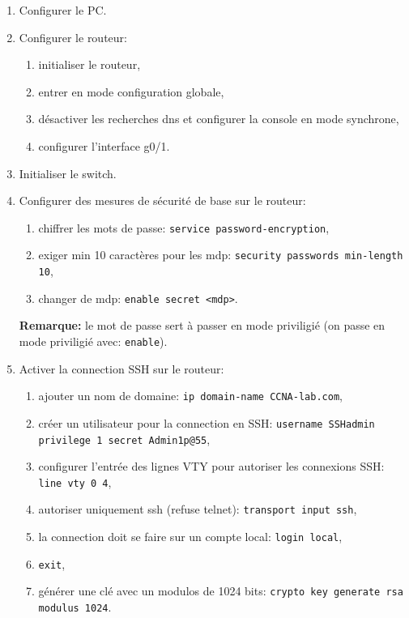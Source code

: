 \documentclass[a4paper]{article}
\begin{document}
\begin{enumerate}

    \item Configurer le PC.

    \item Configurer le routeur:
    \begin{enumerate}
        \item initialiser le routeur,
        \item entrer en mode configuration globale,
        \item désactiver les recherches dns et configurer la console en mode synchrone,
        \item configurer l'interface g0/1.
    \end{enumerate}

    \item Initialiser le switch.

    \item Configurer des mesures de sécurité de base sur le routeur:
    \begin{enumerate}
        \item chiffrer les mots de passe: \texttt{service password-encryption},
        \item exiger min 10 caractères pour les mdp: \texttt{security passwords min-length 10},
        \item changer de mdp: \texttt{enable secret <mdp>}.
    \end{enumerate}
    \textbf{Remarque:} le mot de passe sert à passer en mode priviligié (on passe en mode priviligié avec: \texttt{enable}).

    \item Activer la connection SSH sur le routeur:
    \begin{enumerate}
        \item ajouter un nom de domaine: \texttt{ip domain-name CCNA-lab.com},
        \item créer un utilisateur pour la connection en SSH: \texttt{username SSHadmin privilege 1 secret Admin1p@55},
        \item configurer l'entrée des lignes VTY pour autoriser les connexions SSH: \texttt{line vty 0 4},
        \item autoriser uniquement ssh (refuse telnet): \texttt{transport input ssh},
        \item la connection doit se faire sur un compte local: \texttt{login local},
        \item \texttt{exit},
        \item générer une clé avec un modulos de 1024 bits: \texttt{crypto key generate rsa modulus 1024}.
    \end{enumerate}


\end{enumerate}
\end{document}
